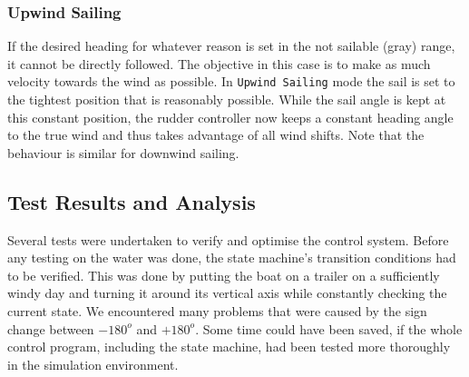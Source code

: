 \subsubsection{Upwind Sailing}
If the desired heading for whatever reason is set in the not sailable (gray)
range, it cannot be directly followed. The objective in this case is to make as
much velocity towards the wind as possible. In \texttt{Upwind Sailing} mode the
sail is set to the tightest position that is reasonably possible. While the
sail angle is kept at this constant position, the rudder controller now keeps a
constant heading angle to the true wind and thus takes advantage of all wind shifts.
Note that the behaviour is similar for downwind sailing.
%
\subsection{Test Results and Analysis} \label{sec:sailor_testing}
Several tests were undertaken to verify and optimise the control system. Before
any testing on the water was done, the state machine's transition conditions
had to be verified. This was done by putting the boat on a trailer on a
sufficiently windy day and turning it around its vertical axis while constantly
checking the current state. We encountered many problems that were caused by
the sign change between $-180^o$ and $+180^o$. Some time could have been saved,
if the whole control program, including the state machine, had been tested more
thoroughly in the simulation environment.

